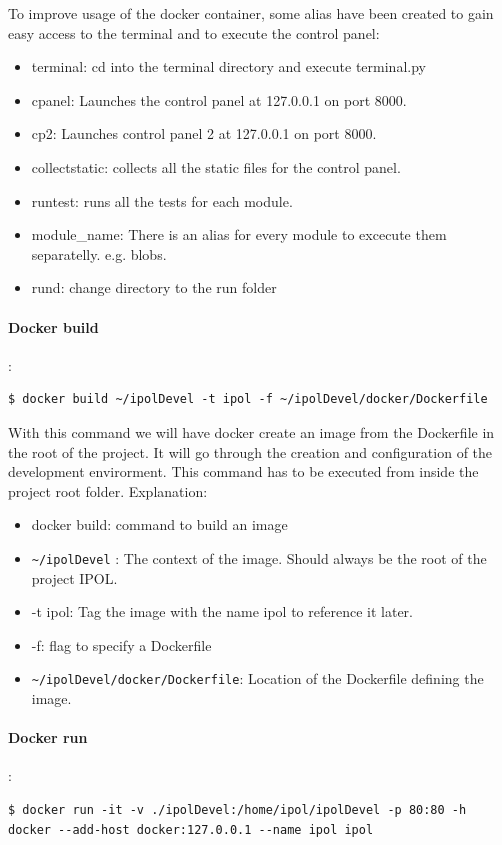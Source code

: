 \documentclass[a4paper,12pt]{article}
\begin{document}
 To improve usage of the docker container, some alias have been created to gain easy access to the terminal and to execute the control panel:
 \begin{itemize}
 	\item terminal: cd into the terminal directory and execute terminal.py
 	\item cpanel: Launches the control panel at 127.0.0.1 on port 8000.
 	\item cp2: Launches control panel 2 at 127.0.0.1 on port 8000.
 	\item collectstatic: collects all the static files for the control panel.
 	\item runtest: runs all the tests for each module.
 	\item module\_name: There is an alias for every module to excecute them separatelly. e.g. blobs.
 	\item rund: change directory to the run folder
 \end{itemize}


\paragraph{Docker build}:\\
\begin{lstlisting}[firstnumber=1,breaklines]
  $ docker build ~/ipolDevel -t ipol -f ~/ipolDevel/docker/Dockerfile
\end{lstlisting}

With this command we will have docker create an image from the Dockerfile in the root of the project. It will go through the creation and configuration of the development envirorment. This command has to be executed from inside the project root folder. Explanation:
\begin{itemize}
  \item docker build: command to build an image
  \item {\tt \~{}/ipolDevel} : The context of the image. Should always be the root of the project IPOL.
  \item -t ipol: Tag the image with the name ipol to reference it later.
  \item -f: flag to specify a Dockerfile
  \item {\tt \~{}/ipolDevel/docker/Dockerfile}: Location of the Dockerfile defining the image.
\end{itemize}

\paragraph{Docker run}:\\
\begin{lstlisting}[firstnumber=1,breaklines]
  $ docker run -it -v ./ipolDevel:/home/ipol/ipolDevel -p 80:80 -h docker --add-host docker:127.0.0.1 --name ipol ipol
\end{lstlisting}
\end{document}
